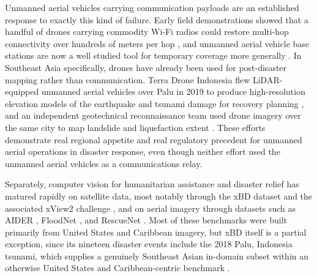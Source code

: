 \documentclass[drones,article,submit,moreauthors]{Definitions/mdpi}
\begin{document}
Unmanned aerial vehicles carrying communication payloads are an established response to exactly this kind of failure. Early field demonstrations showed that a handful of drones carrying commodity Wi-Fi radios could restore multi-hop connectivity over hundreds of meters per hop \cite{panda2019design}, and unmanned aerial vehicle base stations are now a well studied tool for temporary coverage more generally \cite{mozaffari2016efficient,mozaffari2019tutorial,hayat2016survey,gupta2016survey}. In Southeast Asia specifically, drones have already been used for post-disaster mapping rather than communication. Terra Drone Indonesia flew LiDAR-equipped unmanned aerial vehicles over Palu in 2019 to produce high-resolution elevation models of the earthquake and tsunami damage for recovery planning \cite{terra_drone_palu}, and an independent geotechnical reconnaissance team used drone imagery over the same city to map landslide and liquefaction extent \cite{geer_palu_2018}. These efforts demonstrate real regional appetite and real regulatory precedent for unmanned aerial operations in disaster response, even though neither effort used the unmanned aerial vehicles as a communications relay.

Separately, computer vision for humanitarian assistance and disaster relief has matured rapidly on satellite data, most notably through the xBD dataset \cite{gupta2019xbd} and the associated xView2 challenge \cite{weber2020building,gerard2024simple,khattak2024deepdamagenet}, and on aerial imagery through datasets such as AIDER \cite{kyrkou2020emergencynet}, FloodNet \cite{rahnemoonfar2021floodnet}, and RescueNet \cite{rahnemoonfar2023rescuenet}. Most of these benchmarks were built primarily from United States and Caribbean imagery, but xBD itself is a partial exception, since its nineteen disaster events include the 2018 Palu, Indonesia tsunami, which supplies a genuinely Southeast Asian in-domain subset within an otherwise United States and Caribbean-centric benchmark \cite{gupta2019xbd}.
\end{document}
